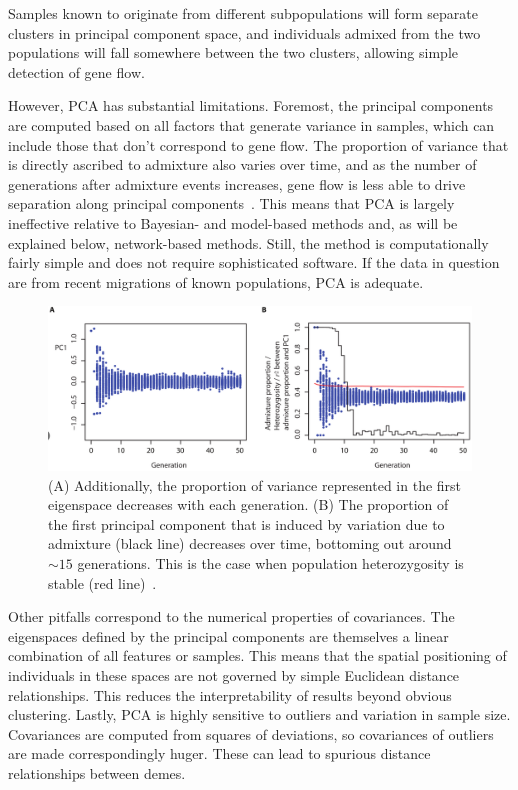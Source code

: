 \documentclass{essay}
\begin{document}
Samples known to originate from different subpopulations will form separate
clusters in principal component space, and individuals admixed from the two
populations will fall somewhere between the two clusters, allowing simple
detection of gene flow.

However, PCA has substantial limitations. Foremost, the principal components
are computed based on all factors that generate variance in samples, which can
include those that don't correspond to gene flow. The proportion of variance
that is directly ascribed to admixture also varies over time, and as the number
of generations after admixture events increases, gene flow is less able to
drive separation along principal components~\cite{mcvean_genealogical_2009}.
This means that PCA is largely ineffective relative to Bayesian- and
model-based methods and, as will be explained below, network-based methods.
Still, the method is computationally fairly simple and does not require
sophisticated software. If the data in question are from recent migrations of
known populations, PCA is adequate.

\begin{figure}
  \includegraphics[width=\linewidth,keepaspectratio]{../Figures/fig1a.png}
  \caption{(A) Additionally, the proportion of variance represented in the
    first eigenspace decreases with each generation. (B) The proportion of the
    first principal component that is induced by variation due to admixture
    (black line) decreases over time, bottoming out around $\sim 15$
    generations. This is the case when population heterozygosity is stable (red
    line)~\cite{mcvean_genealogical_2009}.}
\end{figure}

Other pitfalls correspond to the numerical properties of covariances. The
eigenspaces defined by the principal components are themselves a linear
combination of all features or samples. This means that the spatial positioning
of individuals in these spaces are not governed by simple Euclidean distance
relationships. This reduces the interpretability of results beyond obvious
clustering. Lastly, PCA is highly sensitive to outliers and variation in sample
size. Covariances are computed from squares of deviations, so covariances of
outliers are made correspondingly huger. These can lead to spurious distance
relationships between demes.
\end{document}
